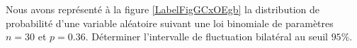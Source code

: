 
\begin{exercice}\label{exosmath-0384}

    Nous avons représenté à la figure \ref{LabelFigGCxOEgb} la distribution de probabilité d'une variable aléatoire suivant une loi binomiale de paramètres \( n=30\) et \( p=0.36\). Déterminer l'intervalle de fluctuation bilatéral au seuil \( 95\%\).


\newcommand{\CaptionFigGCxOEgb}{La distribution des probabilités pour une variable aléatoire de paramètres \( n=30\) et \( p=0.36\).}



\end{exercice}

